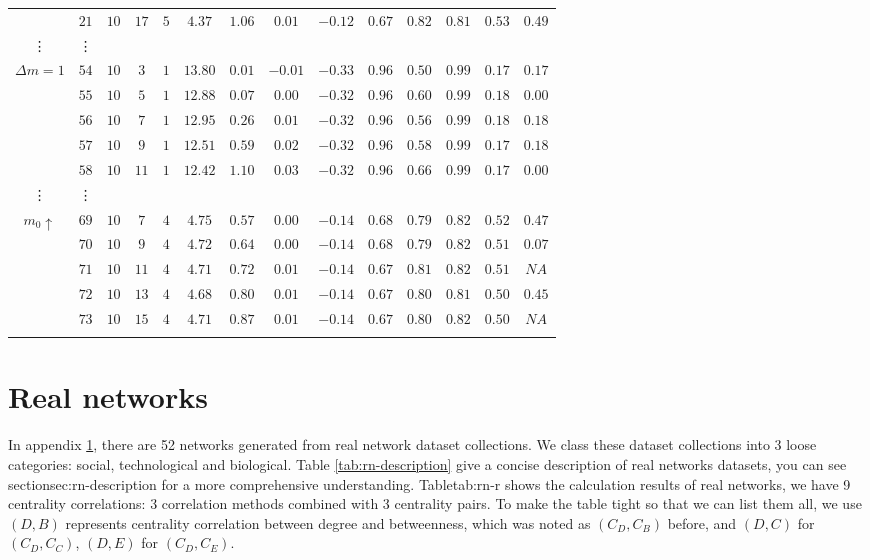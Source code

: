 \documentclass[symmetry,article,submit,moreauthors,pdftex,10pt,a4paper]{Definitions/mdpi}
\begin{document}
\begin{table}[b]
{\begin{minipage}{\textwidth}
\begin{tabular}{c c c c c  c c c c c  c c c c}
&$21$	&	$10$	&	$17$	&	$5$	&	$4.37$	&	$1.06$	&	$0.01$	&	$-0.12$	&	$0.67$	&	$0.82$	&	$0.81$	&	$0.53$	&	$0.49$\\
\vdots  & \vdots \\
\multirow{5}{*}{ $\Delta m=1$}
&$54$	&	$10$	&	$3$	&	$1$	&	$13.80$	&	$0.01$	&	$-0.01$	&	$-0.33$	&	$0.96$	&	$0.50$	&	$0.99$	&	$0.17$	&	$0.17$\\
&$55$	&	$10$	&	$5$	&	$1$	&	$12.88$	&	$0.07$	&	$0.00$	&	$-0.32$	&	$0.96$	&	$0.60$	&	$0.99$	&	$0.18$	&	$0.00$\\
&$56$	&	$10$	&	$7$	&	$1$	&	$12.95$	&	$0.26$	&	$0.01$	&	$-0.32$	&	$0.96$	&	$0.56$	&	$0.99$	&	$0.18$	&	$0.18$\\
&$57$	&	$10$	&	$9$	&	$1$	&	$12.51$	&	$0.59$	&	$0.02$	&	$-0.32$	&	$0.96$	&	$0.58$	&	$0.99$	&	$0.17$	&	$0.18$\\
&$58$	&	$10$	&	$11$	&	$1$	&	$12.42$	&	$1.10$	&	$0.03$	&	$-0.32$	&	$0.96$	&	$0.66$	&	$0.99$	&	$0.17$	&	$0.00$\\
\vdots  & \vdots \\
\multirow{5}{*}{ $m_0 \uparrow$}
&$69$	&	$10$	&	$7$	&	$4$	&	$4.75$	&	$0.57$	&	$0.00$	&	$-0.14$	&	$0.68$	&	$0.79$	&	$0.82$	&	$0.52$	&	$0.47$\\
&$70$	&	$10$	&	$9$	&	$4$	&	$4.72$	&	$0.64$	&	$0.00$	&	$-0.14$	&	$0.68$	&	$0.79$	&	$0.82$	&	$0.51$	&	$0.07$\\
&$71$	&	$10$	&	$11$	&	$4$	&	$4.71$	&	$0.72$	&	$0.01$	&	$-0.14$	&	$0.67$	&	$0.81$	&	$0.82$	&	$0.51$	&	$NA$\\
&$72$	&	$10$	&	$13$	&	$4$	&	$4.68$	&	$0.80$	&	$0.01$	&	$-0.14$	&	$0.67$	&	$0.80$	&	$0.81$	&	$0.50$	&	$0.45$\\
&$73$	&	$10$	&	$15$	&	$4$	&	$4.71$	&	$0.87$	&	$0.01$	&	$-0.14$	&	$0.67$	&	$0.80$	&	$0.82$	&	$0.50$	&	$NA$\\
\noalign{\smallskip}\hline
\end{tabular}
\end{minipage} }
\end{table}
%

\section{Real networks}
\label{app:rn}
\setcounter{table}{0}
\renewcommand{\thetable}{B\arabic{table}}
\setcounter{figure}{0}
\renewcommand{\thefigure}{B\arabic{figure}}
In appendix \ref{app:rn}, there are 52 networks generated from real network dataset collections. We class these dataset collections into 3 loose categories: social, technological and biological. Table \ref{tab:rn-description} give a concise description of real networks datasets, you can see section{sec:rn-description} for a more comprehensive understanding. Table{tab:rn-r} shows the calculation results of real networks, we have 9 centrality correlations: 3 correlation methods combined with 3 centrality pairs. To make the table tight so that we can list them all, we use $(D,B)$ represents centrality correlation between degree and betweenness, which was noted as $(C_D,C_B)$ before, and $(D,C)$ for $(C_D,C_C)$, $(D,E)$ for $(C_D,C_E)$.
\end{document}
